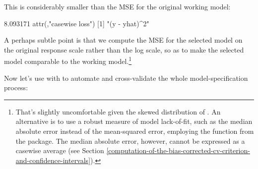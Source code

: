\documentclass[
]{jss}
\begin{document}
This is considerably smaller than the MSE for the original working
model:

\begin{CodeChunk}
\begin{CodeOutput}
[1] 8.093171
attr(,"casewise loss")
[1] "(y - yhat)^2"
\end{CodeOutput}
\end{CodeChunk}

A perhaps subtle point is that we compute the MSE for the selected model
on the original  response scale rather than the log scale, so
as to make the selected model comparable to the working
model.\footnote{That's slightly uncomfortable given the skewed
  distribution of . An alternative is to use a robust measure
  of model lack-of-fit, such as the median absolute error instead of the
  mean-squared error, employing the  function from the
   package. The median absolute error, however, cannot be
  expressed as a casewise average (see Section
  \ref{computation-of-the-bias-corrected-cv-criterion-and-confidence-intervals}).}

Now let's use  with  to
automate and cross-validate the whole model-specification process:
\end{document}
